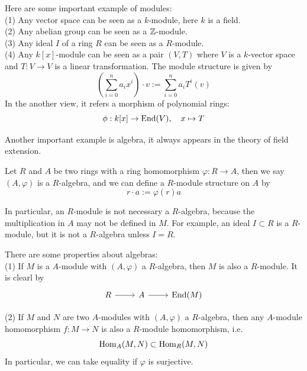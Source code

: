 \begin{example}
    Here are some important example of modules:\\
    (1) Any vector space can be seen as a \(k\)-module, here \(k\) is a field.\\

    (2) Any abelian group can be seen as a \(\mathbb{Z}\)-module. \\

    (3) Any ideal \(I\) of a ring \(R\) can be seen as a \(R\)-module.\\

    (4) Any \(k[x]\)-module can be seen as a pair \((V,T)\) where \(V\) is a \(k\)-vector space and \(T: V \to V\) is a linear transformation. The module structure is given by
    \[(\sum_{i=0}^n a_i x^i) \cdot v := \sum_{i=0}^n a_i T^i(v)\]
    In the another view, it refers a morphism of polynomial rings:
    \[\phi: k[x] \to \operatorname{End}(V), \quad x \mapsto T\]
\end{example}

Another important example is algebra, it always appears in the theory of field extension.
\begin{definition}
    Let \(R\) and \(A\) be two rings with a ring homomorphism \(\varphi: R \to A\), then we say \((A, \varphi)\) is a \(R\)-algebra, and we can define a \(R\)-module structure on \(A\) by
    \[r \cdot a := \varphi(r)a\]
    
\end{definition}

\begin{remark}
    In particular, an \(R\)-module is not necessary a \(R\)-algebra, because the multiplication in \(A\) may not be defined in \(M\). For example, an ideal \(I \subset R\) is a \(R\)-module, but it is not a \(R\)-algebra unless \(I = R\).

    There are some properties about algebras:\\

    (1) If \(M\) is a \(A\)-module with \((A, \varphi)\) a \(R\)-algebra, then \(M\) is also a \(R\)-module. It is clearl by 
\[\begin{tikzcd}
    R & A & {\End(M)}
    \arrow[from=1-1, to=1-2]
    \arrow[from=1-2, to=1-3]
\end{tikzcd}\]

(2) If \(M\) and \(N\) are two \(A\)-modules with \((A, \varphi)\) a \(R\)-algebra, then any \(A\)-module homomorphism \(f: M \to N\) is also a \(R\)-module homomorphism, i.e.
\[\operatorname{Hom}_{A}(M,N) \subset \operatorname{Hom}_{R}(M,N)\]
In particular, we can take equality if \(\varphi\) is surjective.
\end{remark}


